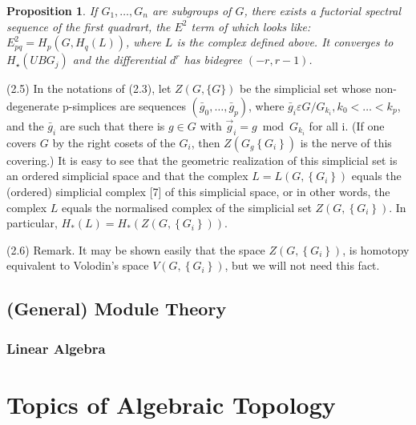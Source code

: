 \documentclass{book}
\newtheorem{prop}{Proposition}
\begin{document}
\begin{prop}
If $G_1, \ldots, G_n$ are subgroups of $G$, there exists a fuctorial spectral sequence of the first quadrart, the $E^2$ term of which looks like: $E_{p q}^2=H_p\left(G, H_q(L)\right)$, where $L$ is the complex defined above. It converges to $H_{\star}\left(U B G_j\right)$ and the differential $d^r$ has bidegree $(-r, r-1)$.   
\end{prop}

(2.5) In the notations of (2.3), let $Z(G,\{G\})$ be the simplicial set whose non-degenerate p-simplices are sequences $\left(\bar{g}_0, \ldots, \bar{g}_p\right)$, where $\bar{g}_i \varepsilon G / G_{k_i}, k_0<\ldots<k_p$, and the $\bar{g}_i$ are such that there is $g \in G$ with $\vec{g}_i=g \bmod G_{k_i}$ for all i. (If one covers $G$ by the right cosets of the $G_i$, then $Z\left(G_g\left\{G_i\right\}\right)$ is the nerve of this covering.) It is easy to see that the geometric realization of this simplicial set is an ordered simplicial space and that the complex $L=L\left(G,\left\{G_i\right\}\right)$ equals the (ordered) simplicial complex [7] of this simplicial space, or in other words, the complex $L$ equals the normalised complex of the simplicial set $Z\left(G,\left\{G_i\right\}\right)$. In particular, $H_*(L)=H_*\left(Z\left(G,\left\{G_i\right\}\right)\right)$.

(2.6) Remark. It may be shown easily that the space $Z\left(G,\left\{G_i\right\}\right)$, is homotopy equivalent to Volodin's space $V\left(G,\left\{G_i\right\}\right)$, but we will not need this fact.








\chapter{(General) Module Theory}

\section{Linear Algebra}









\part{Topics of Algebraic Topology}
\end{document}
